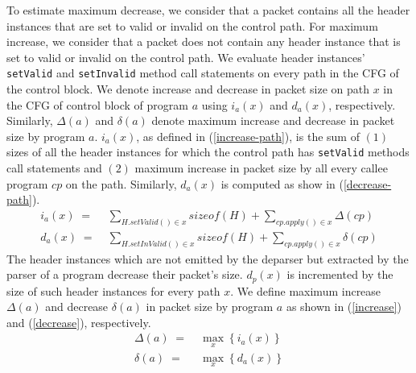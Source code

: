 To estimate maximum decrease, we consider that a packet contains all the header instances that are set to valid or invalid on the control path.
For maximum increase, we consider that a packet does not contain any header instance that is set to valid or invalid on the control path. 
We evaluate header instances' \texttt{setValid} and \texttt{setInvalid} method call statements on every path in the CFG of the control block.
We denote increase and decrease in packet size on path $x$ in the CFG of control block of program $a$ using $i_{a}(x)$ and $d_{a}(x)$, respectively.
Similarly, $\Delta(a)$ and $\delta(a)$ denote maximum increase and decrease in packet size by program $a$.
$i_{a}(x)$, as defined in (\ref{increase-path}), is the sum of $(1)$ sizes of all the header instances for which the control path has \texttt{setValid} methods call statements and $(2)$ maximum increase in packet size by all every callee program $cp$ on the path.
Similarly, $d_{a}(x)$ is computed as show in (\ref{decrease-path}).
\begin{align}
i_{a}(x)\; =& \; \sum_{H.setValid() \in x} sizeof(H) + \sum_{cp.apply()\in x} \Delta(cp) \label{increase-path} \\
d_{a}(x)\; =& \; \sum_{H.setInValid() \in x} sizeof(H) + \sum_{cp.apply()\in x} \delta(cp) \label{decrease-path}
\end{align}
The header instances which are not emitted by the deparser but extracted by the parser of a program decrease their packet's size. 
$d_{p}(x)$ is incremented by the size of such header instances for every path $x$.
We define maximum increase $\Delta(a)$ and decrease $\delta(a)$ in packet size by program $a$ as shown in (\ref{increase}) and (\ref{decrease}), respectively.
\begin{align}
\Delta(a)\; =& \; \max_{x} \left\{ i_{a}(x) \right\} \label{increase} \\
\delta(a)\; =& \; \max_{x} \left\{ d_{a}(x) \right\} \label{decrease}
\end{align}


